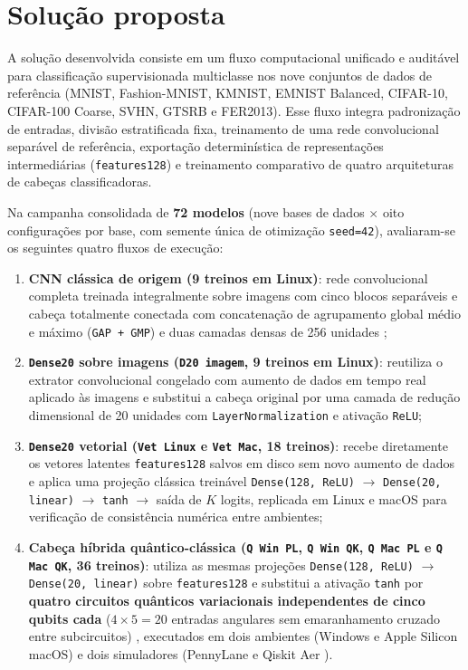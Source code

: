 \documentclass[
    12pt,
    openright,
    oneside,
    a4paper,
    english,
    brazil
]{abntex2}
\begin{document}
\section{Solução proposta}
\label{sec:solucao}

A solução desenvolvida consiste em um fluxo computacional unificado e auditável para classificação supervisionada multiclasse nos nove conjuntos de dados de referência (MNIST, Fashion-MNIST, KMNIST, EMNIST Balanced, CIFAR-10, CIFAR-100 Coarse, SVHN, GTSRB e FER2013). Esse fluxo integra padronização de entradas, divisão estratificada fixa, treinamento de uma rede convolucional separável de referência, exportação determinística de representações intermediárias (\texttt{features128}) e treinamento comparativo de quatro arquiteturas de cabeças classificadoras.

Na campanha consolidada de \textbf{72 modelos} (nove bases de dados \(\times\) oito configurações por base, com semente única de otimização \texttt{seed=42}), avaliaram-se os seguintes quatro fluxos de execução:
\begin{enumerate}
    \item \textbf{CNN clássica de origem (9 treinos em Linux)}: rede convolucional completa treinada integralmente sobre imagens com cinco blocos separáveis e cabeça totalmente conectada com concatenação de agrupamento global médio e máximo (\texttt{GAP + GMP}) e duas camadas densas de 256 unidades \cite{chollet2017xception,wu2018groupnorm,elfwing2018silu};
    \item \textbf{\texttt{Dense20} sobre imagens (\texttt{D20 imagem}, 9 treinos em Linux)}: reutiliza o extrator convolucional congelado com aumento de dados em tempo real aplicado às imagens e substitui a cabeça original por uma camada de redução dimensional de 20 unidades com \texttt{LayerNormalization} e ativação \texttt{ReLU};
    \item \textbf{\texttt{Dense20} vetorial (\texttt{Vet Linux} e \texttt{Vet Mac}, 18 treinos)}: recebe diretamente os vetores latentes \texttt{features128} salvos em disco sem novo aumento de dados e aplica uma projeção clássica treinável \texttt{Dense(128, ReLU)} \(\rightarrow\) \texttt{Dense(20, linear)} \(\rightarrow\) \texttt{tanh} \(\rightarrow\) saída de \(K\) logits, replicada em Linux e macOS para verificação de consistência numérica entre ambientes;
    \item \textbf{Cabeça híbrida quântico-clássica (\texttt{Q Win PL}, \texttt{Q Win QK}, \texttt{Q Mac PL} e \texttt{Q Mac QK}, 36 treinos)}: utiliza as mesmas projeções \texttt{Dense(128, ReLU)} \(\rightarrow\) \texttt{Dense(20, linear)} sobre \texttt{features128} e substitui a ativação \texttt{tanh} por \textbf{quatro circuitos quânticos variacionais independentes de cinco qubits cada} (\(4 \times 5 = 20\) entradas angulares sem emaranhamento cruzado entre subcircuitos) \cite{bergholm2018pennylane,cerezo2021variational}, executados em dois ambientes (Windows e Apple Silicon macOS) e dois simuladores (PennyLane \cite{bergholm2018pennylane} e Qiskit Aer \cite{javadiabhari2024qiskit}).
\end{enumerate}
\end{document}
